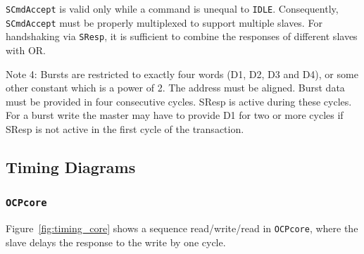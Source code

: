 \documentclass[a4paper,fontsize=10pt,twoside,DIV15,BCOR12mm,headinclude=true,footinclude=false,pagesize,bibtotoc]{scrbook}
\newcommand{\code}[1]{{\texttt{#1}}}
\newcommand{\comment}[3]{

\textsf{\textbf{#1}} {\color{#3}#2}}
\newcommand{\wolf}[1]{\comment{Wolfgang}{#1}{OliveGreen}}
\newcommand{\martin}[1]{\comment{Martin}{#1}{Blue}}
\renewcommand{\wolf}[1]{}
\renewcommand{\martin}[1]{}
\begin{document}
\code{SCmdAccept} is valid only while a command is unequal to
\code{IDLE}. Consequently, \code{SCmdAccept} must be properly
multiplexed to support multiple slaves. For handshaking via
\code{SResp}, it is sufficient to combine the responses of different
slaves with OR.

\wolf{With \code{writeresp\_enable} we could also require a response
  for ``normal'' writes.}

\wolf{\code{OCPburst} currently allows neither pipelining nor
  same-cycle responses. If we want to, we can make it more like
  \code{OCPcore} or \code{OCPio}.}

\wolf{I am pretty sure that we need to include \code{MDataValid} when
  using single request bursts. Please check if you understand the spec
  the same way.}

Note 4:
Bursts are restricted to exactly four words (D1, D2, D3 and D4), or some other constant which is a power of 2.  The address must be aligned. Burst data must be provided in four consecutive cycles. SResp is active during these cycles. For a burst write the master may have to provide D1 for two or more cycles if SResp is not active in the first cycle of the transaction.

\wolf{\code{SResp} is \emph{not} active during write bursts according
  to the OCP spec. If necessary, handshaking for write bursts is done
  via \code{SCmdAccept} and/or \code{SDataAccept}.}

\martin{Bust: Is it legal (in our OCP subset) that SCmdAccept comes earlier than SDataAccept?}

\martin{Burst: we said that we do not support pipelined requests in bust mode.
So when the slave sets SResp we are not allowing the master to initiate the next
request in the same cycle. Right?}

\martin{Are OCP addresses always in bytes? Even on the burst interface? I assume yes.
We need to look this up. -- According to Wolfgang they are.}


\clearpage
\subsection{Timing Diagrams}

\subsubsection{\code{OCPcore}}

Figure~\ref{fig:timing_core} shows a sequence read/write/read in
\code{OCPcore}, where the slave delays the response to the write by
one cycle.
\end{document}
